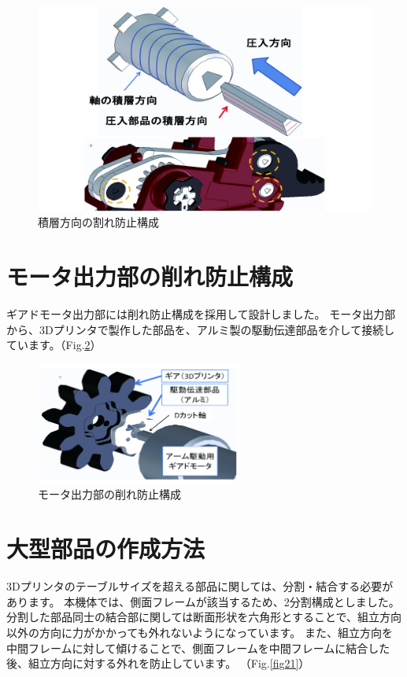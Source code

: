 \begin{figure}[htbp]
\centering
\includegraphics[width=370pt]{fig/fig20_cmyk.jpg}
\caption{積層方向の割れ防止構成}
\label{fig20}
\end{figure}

\clearpage

\section{モータ出力部の削れ防止構成}\label{ux30e2ux30fcux30bfux51faux529bux90e8ux306eux524aux308cux9632ux6b62ux69cbux6210}

ギアドモータ出力部には削れ防止構成を採用して設計しました。
モータ出力部から、3Dプリンタで製作した部品を、アルミ製の駆動伝達部品を介して接続しています。（Fig.\ref{fig19}）

\begin{figure}[htbp]
\centering
\includegraphics[width=190pt]{fig/fig19_cmyk.jpg}
\caption{モータ出力部の削れ防止構成}
\label{fig19}
\end{figure}

\section{大型部品の作成方法}\label{ux5927ux578bux90e8ux54c1ux306eux4f5cux6210ux65b9ux6cd5}

3Dプリンタのテーブルサイズを超える部品に関しては、分割・結合する必要があります。
本機体では、側面フレームが該当するため、2分割構成としました。
分割した部品同士の結合部に関しては断面形状を六角形とすることで、組立方向以外の方向に力がかかっても外れないようになっています。
また、組立方向を中間フレームに対して傾けることで、側面フレームを中間フレームに結合した後、組立方向に対する外れを防止しています。
（Fig.\ref{fig21}）

